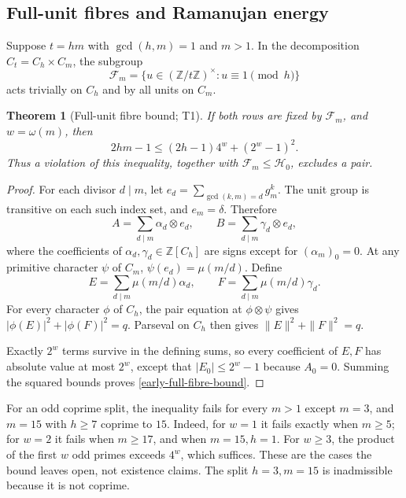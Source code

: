 \documentclass[11pt]{article}
\newtheorem{theorem}{Theorem}[section]
\theoremstyle{definition}
\theoremstyle{remark}
\begin{document}
\subsection{Full-unit fibres and Ramanujan energy}
\label{early-full-fibre}

Suppose $t=hm$ with $\gcd(h,m)=1$ and $m>1$. In the decomposition
$C_t=C_h\times C_m$, the subgroup
\[
 \mathcal F_m=\{u\in(\mathbb Z/t\mathbb Z)^\times:u\equiv1\pmod h\}
\]
acts trivially on $C_h$ and by all units on $C_m$.

\begin{theorem}[Full-unit fibre bound; T1]
\label{early-t1}
If both rows are fixed by $\mathcal F_m$, and $w=\omega(m)$, then
\begin{equation}
 2hm-1\leq(2h-1)4^w+(2^w-1)^2.
 \label{early-full-fibre-bound}
\end{equation}
Thus a violation of this inequality, together with
$\mathcal F_m\leq\mathcal H_0$, excludes a pair.
\end{theorem}

\begin{proof}
For each divisor $d\mid m$, let $e_d=\sum_{\gcd(k,m)=d}g_m^k$. The unit
group is transitive on each such index set, and $e_m=\delta$. Therefore
\[
 A=\sum_{d\mid m}\alpha_d\otimes e_d,\qquad
 B=\sum_{d\mid m}\gamma_d\otimes e_d,
\]
where the coefficients of $\alpha_d,\gamma_d\in\mathbb Z[C_h]$ are signs
except for $(\alpha_m)_0=0$. At any primitive character $\psi$ of $C_m$,
$\psi(e_d)=\mu(m/d)$. Define
\[
 E=\sum_{d\mid m}\mu(m/d)\alpha_d,\qquad
 F=\sum_{d\mid m}\mu(m/d)\gamma_d.
\]
For every character $\phi$ of $C_h$, the pair equation at
$\phi\otimes\psi$ gives $|\phi(E)|^2+|\phi(F)|^2=q$. Parseval on $C_h$
then gives $\|E\|^2+\|F\|^2=q$.

Exactly $2^w$ terms survive in the defining sums, so every coefficient of
$E,F$ has absolute value at most $2^w$, except that $|E_0|\leq2^w-1$
because $A_0=0$. Summing the squared bounds proves
\eqref{early-full-fibre-bound}.
\end{proof}

For an odd coprime split, the inequality fails for every $m>1$ except
$m=3$, and $m=15$ with $h\geq7$ coprime to $15$. Indeed, for $w=1$ it
fails exactly when $m\geq5$; for $w=2$ it fails when $m\geq17$, and when
$m=15,h=1$. For $w\geq3$, the product of the first $w$ odd primes exceeds
$4^w$, which suffices. These are the cases the bound leaves open, not
existence claims. The split $h=3,m=15$ is inadmissible because it is not
coprime.
\end{document}
